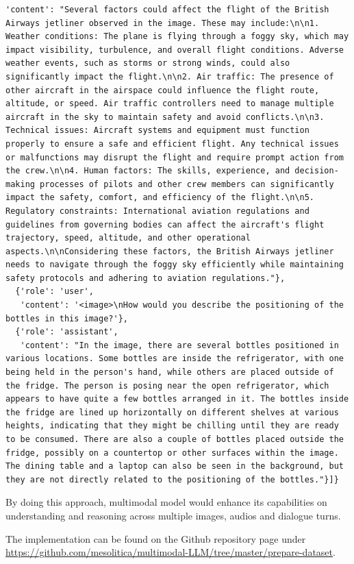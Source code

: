 \documentclass[preprint]{article}
\begin{document}
\begin{lstlisting}[breaklines=true]
   'content': "Several factors could affect the flight of the British Airways jetliner observed in the image. These may include:\n\n1. Weather conditions: The plane is flying through a foggy sky, which may impact visibility, turbulence, and overall flight conditions. Adverse weather events, such as storms or strong winds, could also significantly impact the flight.\n\n2. Air traffic: The presence of other aircraft in the airspace could influence the flight route, altitude, or speed. Air traffic controllers need to manage multiple aircraft in the sky to maintain safety and avoid conflicts.\n\n3. Technical issues: Aircraft systems and equipment must function properly to ensure a safe and efficient flight. Any technical issues or malfunctions may disrupt the flight and require prompt action from the crew.\n\n4. Human factors: The skills, experience, and decision-making processes of pilots and other crew members can significantly impact the safety, comfort, and efficiency of the flight.\n\n5. Regulatory constraints: International aviation regulations and guidelines from governing bodies can affect the aircraft's flight trajectory, speed, altitude, and other operational aspects.\n\nConsidering these factors, the British Airways jetliner needs to navigate through the foggy sky efficiently while maintaining safety protocols and adhering to aviation regulations."},
  {'role': 'user',
   'content': '<image>\nHow would you describe the positioning of the bottles in this image?'},
  {'role': 'assistant',
   'content': "In the image, there are several bottles positioned in various locations. Some bottles are inside the refrigerator, with one being held in the person's hand, while others are placed outside of the fridge. The person is posing near the open refrigerator, which appears to have quite a few bottles arranged in it. The bottles inside the fridge are lined up horizontally on different shelves at various heights, indicating that they might be chilling until they are ready to be consumed. There are also a couple of bottles placed outside the fridge, possibly on a countertop or other surfaces within the image. The dining table and a laptop can also be seen in the background, but they are not directly related to the positioning of the bottles."}]}
\end{lstlisting}

By doing this approach, multimodal model would enhance its capabilities on understanding and reasoning across multiple images, audios and dialogue turns.


The implementation can be found on the Github repository page under \href{https://github.com/mesolitica/multimodal-LLM/tree/master/prepare-dataset}{https://github.com/mesolitica/multimodal-LLM/tree/master/prepare-dataset}.
\end{document}
